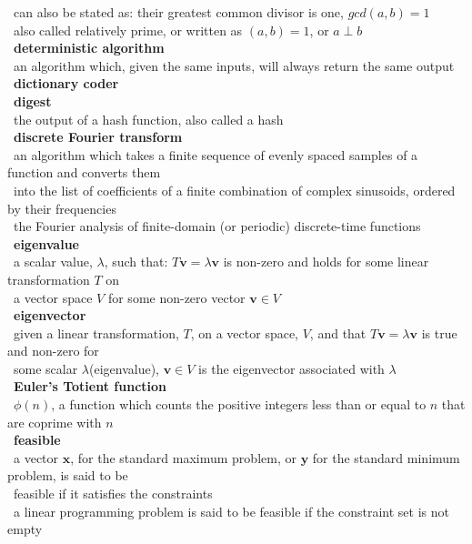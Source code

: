 \documentclass[10pt,letterpaper]{scrartcl}
\newcommand{\tbul}{\textbullet}
\newcommand{\tend}{\>\textendash}
\begin{document}
\begin{tabbing}
    \tend\ can also be stated as: their greatest common divisor is one, $gcd(a,b)=1$ \\
    \tend\ also called relatively prime, or written as $(a,b)=1$, or $a\perp b$ \\
\tbul\ \textbf{deterministic algorithm} \\
    \tend\ an algorithm which, given the same inputs, will always return the same output\\
\tbul\ \textbf{dictionary coder} \\
\tbul\ \textbf{digest} \\
    \tend\ the output of a hash function, also called a hash \\
\tbul\ \textbf{discrete Fourier transform} \\
    \tend\ an algorithm which takes a finite sequence of evenly spaced samples of a function and converts them \\ \>\ into the list of coefficients of a finite combination of complex sinusoids, ordered by their frequencies \\
    \tend\ the Fourier analysis of finite-domain (or periodic) discrete-time functions \\
\tbul\ \textbf{eigenvalue} \\
    \tend\ a scalar value, $\lambda$, such that: $T\mathbf{v}=\lambda\mathbf{v}$ is non-zero and holds for some linear transformation $T$ on \\ \>\ a vector space $V$ for some non-zero vector $\mathbf{v} \in V$\\
\tbul\ \textbf{eigenvector} \\
    \tend\ given a linear transformation, $T$, on a vector space, $V$, and that $T\mathbf{v}=\lambda\mathbf{v}$ is true and non-zero for \\ \>\ some scalar $\lambda$(eigenvalue), $\mathbf{v} \in V$ is the eigenvector associated with $\lambda$ \\
\tbul\ \textbf{Euler's Totient function} \\
    \tend\ $\phi (n)$, a function which counts the positive integers less than or equal to $n$ that are coprime with $n$\\
\tbul\ \textbf{feasible} \\
    \tend\ a vector $\mathbf{x}$, for the standard maximum problem, or $\mathbf{y}$ for the standard minimum problem, is said to be \\ \>\ feasible if it satisfies the constraints \\
    \tend\ a linear programming problem is said to be feasible if the constraint set is not empty \\

\end{tabbing}
\end{document}
